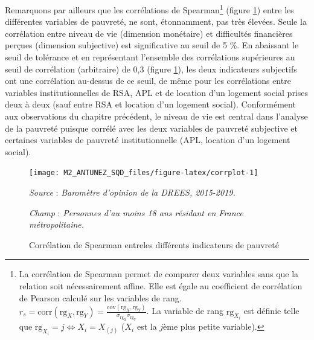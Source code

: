 \documentclass[12pt,a4paper]{reedthesis}
\begin{document}
Remarquons par ailleurs que les corrélations de Spearman\footnote{La corrélation de Spearman permet de comparer deux variables sans que la relation soit nécessairement affine. Elle est égale au coefficient de corrélation de Pearson calculé sur les variables de rang. \(r_s = \mathrm{corr}(\mathrm{rg}_X, \mathrm{rg}_Y) = \frac{\mathrm{cov}(\mathrm{rg}_X, \mathrm{rg}_Y)}{\sigma_{\mathrm{rg}_X} \sigma_{\mathrm{rg}_Y}}\). La variable de rang \(\mathrm{rg}_{X_i}\) est définie telle que \(\mathrm{rg}_{X_i}=j \iff X_i = X_{(j)}\) (\(X_i\) est la \(j\)ème plus petite variable).} (figure \ref{fig:corrplot}) entre les différentes variables de pauvreté, ne sont, étonnamment, pas très élevées. Seule la corrélation entre niveau de vie (dimension monétaire) et difficultés financières perçues (dimension subjective) est significative au seuil de 5 \%. En abaissant le seuil de tolérance et en représentant l'ensemble des corrélations supérieures au seuil de corrélation (arbitraire) de 0,3 (figure \ref{fig:corrplot}), les deux indicateurs subjectifs ont une corrélation au-dessus de ce seuil, de même pour les corrélations entre variables institutionnelles de RSA, APL et de location d'un logement social prises deux à deux (sauf entre RSA et location d'un logement social). Conformément aux observations du chapitre précédent, le niveau de vie est central dans l'analyse de la pauvreté puisque corrélé avec les deux variables de pauvreté subjective et certaines variables de pauvreté institutionnelle (APL, location d'un logement social).
\begin{figure}[!ht]

{\centering \texttt{[image: M2\_ANTUNEZ\_SQD\_files/figure-latex/corrplot-1]} 

}

\caption[Corrélation de Spearman entreles différents indicateurs de pauvreté]{Corrélation de Spearman entreles différents indicateurs de pauvreté}\label{fig:corrplot}

\footnotesize


\emph{Source} : \emph{Baromètre d’opinion de la DREES, 2015-2019.}


\emph{Champ} : \emph{Personnes d’au moins 18 ans résidant en France métropolitaine.}
\normalsize\end{figure}
\end{document}
